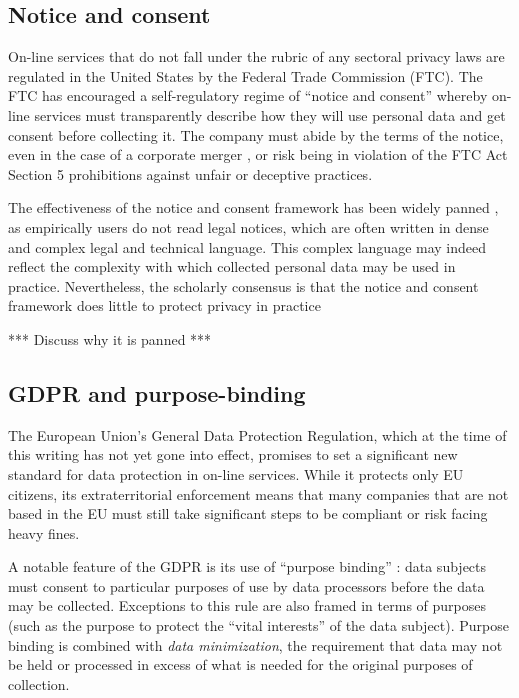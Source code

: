 \documentclass[../thesis.tex]{subfiles}
\begin{document}
\subsection{Notice and consent}

On-line services that do
not fall under the rubric of any sectoral privacy
laws are regulated in the United States by the
Federal Trade Commission (FTC).
The FTC has encouraged a self-regulatory regime
of ``notice and consent'' whereby on-line services
must transparently describe how they will use
personal data and get consent before collecting it.
The company must abide by the terms of the notice,
even in the case of a corporate merger \cite{hine_2015},
or risk being in violation of the FTC Act Section 5
prohibitions against unfair or deceptive practices. 

The effectiveness of the notice and consent framework
has been widely panned \cite{barocas2009notice}
\cite{reidenberg2015privacy}, as empirically users do
not read legal notices, which are often written in
dense and complex legal and technical language.
This complex language may indeed reflect the complexity
with which collected personal data may be used
\cite{schaub2015design} in practice.
Nevertheless, the scholarly consensus is that
the notice and consent framework does little to
protect privacy in practice

*** Discuss why it is panned ***

\subsection{GDPR and purpose-binding}
\label{sec:GDPR}

The European Union's General Data Protection Regulation,
which at the time of this writing has not yet gone into
effect, promises to set a significant new standard for
data protection in on-line services.
While it protects only EU citizens, its extraterritorial
enforcement means that many companies that are not based in
the EU must still take significant steps to be compliant
or risk facing heavy fines.

A notable feature of the GDPR is its use of ``purpose binding''
\cite{hildebrandt2013slaves} \cite{herrmann2016privacy}:
data subjects must consent to particular purposes of use
by data processors before the data may be collected.
Exceptions to this rule are also framed in terms of purposes
(such as the purpose to protect the ``vital interests''
of the data subject).
Purpose binding is combined with \emph{data minimization},
the requirement
that data may not be held or processed in excess of what
is needed for the original purposes of collection.
\end{document}
